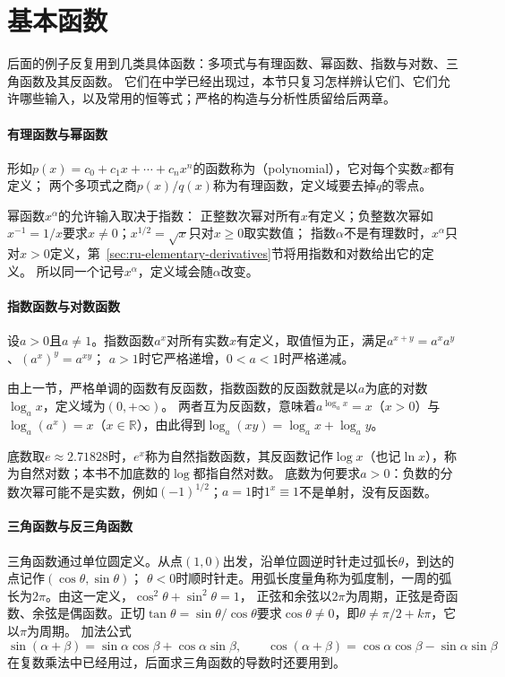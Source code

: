 \section{基本函数}
\label{sec:ru-elementary-functions}

后面的例子反复用到几类具体函数：多项式与有理函数、幂函数、指数与对数、三角函数及其反函数。
它们在中学已经出现过，本节只复习怎样辨认它们、它们允许哪些输入，以及常用的恒等式；严格的构造与分析性质留给后两章。

\paragraph{有理函数与幂函数}
形如$p(x)=c_0+c_1x+\cdots+c_nx^n$的函数称为（polynomial），它对每个实数$x$都有定义；
两个多项式之商$p(x)/q(x)$称为有理函数，定义域要去掉$q$的零点。

幂函数$x^\alpha$的允许输入取决于指数：
正整数次幂对所有$x$有定义；负整数次幂如$x^{-1}=1/x$要求$x\neq0$；$x^{1/2}=\sqrt x$只对$x\geq0$取实数值；
指数$\alpha$不是有理数时，$x^\alpha$只对$x>0$定义，第~\ref{sec:ru-elementary-derivatives}节将用指数和对数给出它的定义。
所以同一个记号$x^\alpha$，定义域会随$\alpha$改变。

\paragraph{指数函数与对数函数}
设$a>0$且$a\neq1$。指数函数$a^x$对所有实数$x$有定义，取值恒为正，满足$a^{x+y}=a^xa^y$、$(a^x)^y=a^{xy}$；
$a>1$时它严格递增，$0<a<1$时严格递减。

由上一节，严格单调的函数有反函数，指数函数的反函数就是以$a$为底的对数$\log_ax$，定义域为$(0,+\infty)$。
两者互为反函数，意味着$a^{\log_ax}=x$（$x>0$）与$\log_a(a^x)=x$（$x\in\mathbb R$），由此得到$\log_a(xy)=\log_ax+\log_ay$。

底数取$e\approx2.71828$时，$e^x$称为自然指数函数，其反函数记作$\log x$（也记$\ln x$），称为自然对数；本书不加底数的$\log$都指自然对数。
底数为何要求$a>0$：负数的分数次幂可能不是实数，例如$(-1)^{1/2}$；$a=1$时$1^x\equiv1$不是单射，没有反函数。

\paragraph{三角函数与反三角函数}
三角函数通过单位圆定义。从点$(1,0)$出发，沿单位圆逆时针走过弧长$\theta$，到达的点记作$(\cos\theta,\sin\theta)$；
$\theta<0$时顺时针走。用弧长度量角称为弧度制，一周的弧长为$2\pi$。由这一定义，$\cos^2\theta+\sin^2\theta=1$，
正弦和余弦以$2\pi$为周期，正弦是奇函数、余弦是偶函数。正切$\tan\theta=\sin\theta/\cos\theta$要求$\cos\theta\neq0$，即$\theta\neq\pi/2+k\pi$，它以$\pi$为周期。
加法公式
\[
 \sin(\alpha+\beta)=\sin\alpha\cos\beta+\cos\alpha\sin\beta,\qquad
 \cos(\alpha+\beta)=\cos\alpha\cos\beta-\sin\alpha\sin\beta
\]
在复数乘法中已经用过，后面求三角函数的导数时还要用到。

